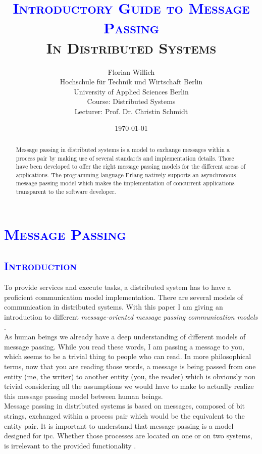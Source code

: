 \documentclass[xcolor=dvipsnames]{article}
\title{\scshape{\textbf{\textcolor{blue}{Introductory Guide to Message Passing}}\\In Distributed Systems}}
\author{Florian Willich \\ Hochschule f\"ur Technik und Wirtschaft Berlin \\ University of Applied Sciences Berlin \\ Course: Distributed Systems \\ Lecturer: Prof. Dr. Christin Schmidt}
\date{\today}
\begin{document}
\maketitle

\begin{abstract}

Message passing in distributed systems is a model to exchange messages within a process pair by making use of several standards and implementation details. Those have been developed to offer the right message passing models for the different areas of applications. The programming language Erlang natively supports an asynchronous message passing model which makes the implementation of concurrent applications transparent to the software developer.

\end{abstract}

\tableofcontents

\newpage

\section{\scshape{\textcolor{blue}{Message Passing}}} \label{introduction}

\subsection{\scshape{\textcolor{blue}{Introduction}}}

To provide services and execute tasks, a distributed system has to have a proficient communication model implementation. There are several models of communication in distributed systems. With this paper I am giving an introduction to different \textit{message-oriented message passing communication models} \cite[chap. 4.3 on p. 140 - 141]{tanenbaum}.\\

\noindent As human beings we already have a deep understanding of different models of message passing. While you read these words, I am passing a message to you, which seems to be a trivial thing to people who can read. In more philosophical terms, now that you are reading those words, a message is being passed from one entity (me, the writer) to another entity (you, the reader) which is obviously non trivial considering all the assumptions we would have to make to actually realize this message passing model between human beings.\\

\noindent Message passing in distributed systems is based on messages, composed of bit strings, exchanged within a process pair which would be the equivalent to the entity pair. It is important to understand that message passing is a model designed for \gls{ipc}. Whether those processes are located on one or on two systems, is irrelevant to the provided functionality \cite[ch. 4 - 4.1.1 on p. 115 - 117]{tanenbaum}.
\end{document}
